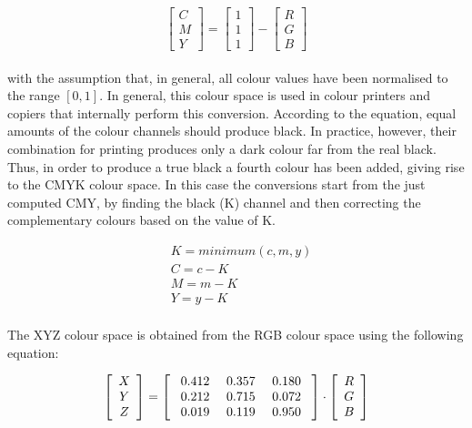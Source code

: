 \documentclass[final,a4paper,12pt,english]{UnicaPhdThesis3}
\begin{document}
	\begin{equation}
	\left [ { \begin{array}{c} C  \\ M   \\ Y \end{array} } \right ] = 
	\left [ { \begin{array}{c} 1   \\ 1   \\ 1 \end{array} } \right ]  - \left [ { \begin{array}{c} R  \\ G  \\ B     \end{array} } \right ] 
	\end{equation}
	\\
	with the assumption that, in general, all colour values have been normalised to the range $[0,1]$. In general, this colour space is used in colour printers and copiers that internally perform this conversion. According to the equation, equal amounts of the colour channels should produce black. In practice, however, their combination for printing produces only a dark colour far from the real black. Thus, in order to produce a true black a fourth colour has been added, giving rise to the CMYK colour space. In this case the conversions start from the just computed CMY, by finding the black (K) channel and then correcting the complementary colours based on the value of K.
	
	\begin{equation}\label{cmyk}
	\begin{split}
	&K = minimum (c, m, y)\\
	&C = c - K\\
	&M = m - K\\
	&Y = y - K\\
	\end{split}
	\end{equation}
	
	The XYZ colour space is obtained from the RGB colour space using the following equation:
	
	\begin{equation}
	\left [ { \begin{array}{c} X  \\ Y   \\ Z \end{array} } \right ] = 
	\left [ { \begin{array}{c c c} \mbox{ 0.412}  & \mbox{ 0.357} &  \mbox{ 0.180 } \\ \mbox{ 0.212} & \mbox{ 0.715} & \mbox{ 0.072 } \\ \mbox{ 0.019} & \mbox{ 0.119} & \mbox{ 0.950 }  \end{array} } \right ] \cdot \left [ { \begin{array}{c} R  \\ G  \\ B     \end{array} } \right ] 
	\end{equation}
	
\end{document}
